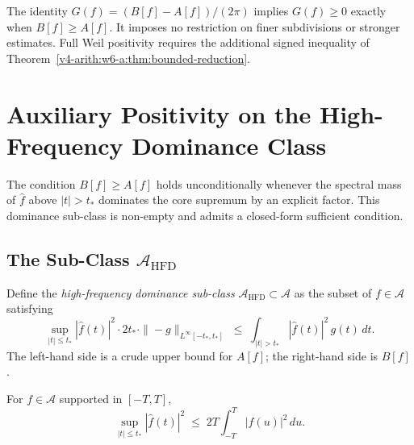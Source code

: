 \begin{remark}
\label{v4-arith:w6-a:rem:why-not-more}
The identity \(G(f)=(B[f]-A[f])/(2\pi)\) implies
\(G(f)\geq0\) exactly when \(B[f]\geq A[f]\). It imposes no
restriction on finer subdivisions or stronger estimates. Full
Weil positivity requires the additional signed inequality of
Theorem~\ref{v4-arith:w6-a:thm:bounded-reduction}.
\end{remark}

\section{Auxiliary Positivity on the High-Frequency Dominance Class}
\label{v4-arith:w6-a:HFD-subclass}

The condition \(B[f]\geq A[f]\) holds unconditionally whenever the
spectral mass of \(\widehat{f}\) above \(|t|>t_{\ast}\) dominates the
core supremum by an explicit factor. This dominance sub-class is
non-empty and admits a closed-form sufficient condition.

\subsection{The Sub-Class \(\mathscr A_{\mathrm{HFD}}\)}
\label{v4-arith:w6-a:HFD-subclass:def}

\begin{definition}
\label{v4-arith:w6-a:def:HFD-class}
Define the \emph{high-frequency dominance
sub-class} \(\mathscr A_{\mathrm{HFD}}\subset\mathscr A\)
as the subset of \(f\in\mathscr A\) satisfying
\begin{equation}
\label{v4-arith:w6-a:eq:HFD-condition}
\sup_{|t|\leq t_{\ast}}|\widehat{f}(t)|^{2}\cdot 2t_{\ast}\cdot\|{-}g\|_{L^{\infty}[-t_{\ast},t_{\ast}]}
\;\leq\;
\int_{|t|>t_{\ast}}|\widehat{f}(t)|^{2}\,g(t)\,dt.
\end{equation}
The left-hand side is a crude upper bound for \(A[f]\); the right-hand
side is \(B[f]\).
\end{definition}

\begin{lemma}
\label{v4-arith:w6-a:lem:PP-bound}
For \(f\in\mathscr A\) supported
in \([-T,T]\),
\begin{equation}
\label{v4-arith:w6-a:eq:PP-inside-core}
\sup_{|t|\leq t_{\ast}}|\widehat{f}(t)|^{2}\;\leq\;2T\int_{-T}^{T}|f(u)|^{2}\,du.
\end{equation}
\end{lemma}

